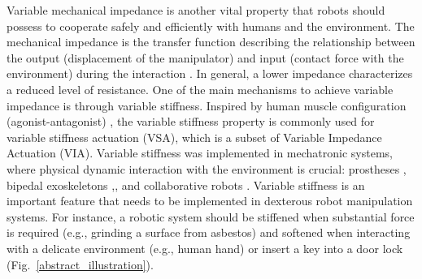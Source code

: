 \documentclass[lettersize,journal]{IEEEtran}
\begin{document}
\par Variable mechanical impedance is another vital property that robots should possess to cooperate safely and efficiently with humans and the environment. The mechanical impedance is the transfer function describing the relationship between the output (displacement of the manipulator) and input (contact force with the environment) during the interaction \cite{song2019tutorial}. In general, a lower impedance characterizes a reduced level of resistance. One of the main mechanisms to achieve variable impedance is through variable stiffness. Inspired by human muscle configuration (agonist-antagonist) \cite{gomi1992human}, the variable stiffness property is commonly used for variable stiffness actuation (VSA), which is a subset of Variable Impedance Actuation (VIA). Variable stiffness was implemented in mechatronic systems, where physical dynamic interaction with the environment is crucial: prostheses \cite{lemerle2019variable}, bipedal exoskeletons \cite{hutter2012efficient},\cite{ugurlu2015variable}, and collaborative robots \cite{gandarias2020open}. 
Variable stiffness is an important feature that needs to be implemented in dexterous robot manipulation systems. For instance, a robotic system should be stiffened when substantial force is required (e.g., grinding a surface from asbestos) and softened when interacting with a delicate environment (e.g., human hand) or insert a key into a door lock (Fig.~\ref{abstract_illustration}). 
\end{document}
